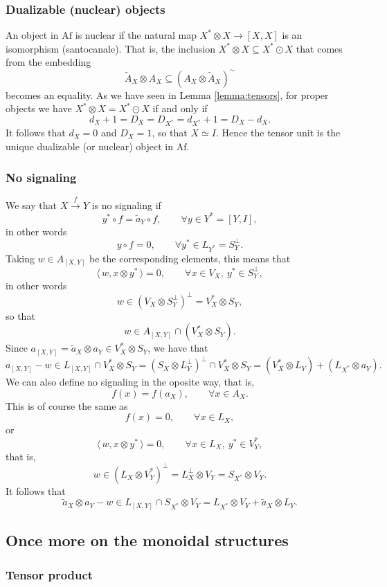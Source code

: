 \documentclass[12pt]{article}
\theoremstyle{definition}
\theoremstyle{remark}
\def\<{\langle\,}
\def\>{\,\rangle}
\def \Af{\mathrm{Af}}
\begin{document}
\subsubsection{Dualizable (nuclear) objects}

An object in $\Af$ is nuclear if the natural map $X^*\otimes X\to [X,X]$ is an isomorphism
(santocanale). That is, the inclusion $X^*\otimes X\subseteq X^*\odot X$ that comes from the embedding 
\[
\tilde A_X\otimes A_X\subseteq (A_X\otimes \tilde A_X)^\sim
\]
becomes an equality. As we have seen in Lemma \ref{lemma:tensors}, for proper objects we
have $X^*\otimes X=X^*\odot X$ if and only if
\[
d_X+1=D_X=D_{X^*}=d_{X^*}+1=D_X-d_X.
\]
It follows that $d_X=0$ and $D_X=1$, so that $X\simeq I$. Hence the tensor unit is the
unique dualizable (or nuclear) object in $\Af$.


\subsubsection{No signaling}

We say that $X\xrightarrow{f} Y$ is no signaling if
\[
y^*\circ f=\tilde a_Y\circ f,\qquad \forall y\in Y^*=[Y,I],
\]
in other words
\[
y\circ f=0,\qquad \forall y^*\in L_{Y^*}=S_Y^\perp.
\]
Taking $w\in A_{[X,Y]}$ be the corresponding elements, this means that
\[
\<w,x\otimes y^*\>=0,\qquad \forall x\in V_X,\ y^*\in S_Y^\perp,
\]
in other words
\[
w\in (V_X\otimes S_Y^\perp)^\perp=V^*_X\otimes S_Y,
\]
so that
\[
w\in A_{[X,Y]}\cap (V^*_X\otimes S_Y).
\]
Since $a_{[X,Y]}=\tilde a_X\otimes a_Y\in V^*_X\otimes S_Y$, we have that
\[
a_{[X,Y]}-w\in L_{[X,Y]}\cap V^*_X\otimes S_Y=(S_X\otimes L_Y^\perp)^\perp\cap
V^*_X\otimes S_Y=(V_X^*\otimes L_Y)+ (L_{X^*}\otimes a_Y).
\]
We can also define no signaling in the oposite way, that is,
\[
f(x)=f(a_X),\qquad \forall x\in A_X.
\]
This is of course the same as 
\[
f(x)=0,\qquad \forall x\in L_X,
\]
or
\[
\<w,x\otimes y^*\>=0,\qquad \forall x\in L_X,\ y^*\in V_Y^*,
\]
that is,
\[
w\in (L_X\otimes V_Y^*)^\perp=L_X^\perp\otimes V_Y=S_{X^*}\otimes V_Y.
\]
It follows that
\[
\tilde a_X\otimes a_Y-w\in L_{[X,Y]}\cap S_{X^*}\otimes V_Y=L_{X^*}\otimes V_Y+\tilde
a_X\otimes L_Y.
\]

\subsection{Once more on the monoidal structures}

\subsubsection{Tensor product}
\end{document}
